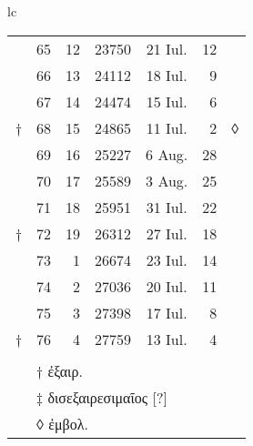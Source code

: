 \begin{tabular}{lc}
\begin{tabular}[t]{r rrccr l}
\cline{2-6}
~ & 65 & 12 & 23750 & 21 Iul. & 12 \\
~ & 66 & 13 & 24112 & 18 Iul. &  9 \\
~ & 67 & 14 & 24474 & 15 Iul. &  6 \\
† & 68 & 15 & 24865 & 11 Iul. &  2 & ◊ \\
\cline{2-6}
~ & 69 & 16 & 25227 &  6 Aug. & 28 \\
~ & 70 & 17 & 25589 &  3 Aug. & 25 \\
~ & 71 & 18 & 25951 & 31 Iul. & 22 \\
† & 72 & 19 & 26312 & 27 Iul. & 18 \\
\cline{2-6}
~ & 73 &  1 & 26674 & 23 Iul. & 14 \\
~ & 74 &  2 & 27036 & 20 Iul. & 11 \\
~ & 75 &  3 & 27398 & 17 Iul. &  8 \\
† & 76 &  4 & 27759 & 13 Iul. &  4 \\
\cline{2-6}
\\
~ & \multicolumn{5}{l}{† \textgreek{ἐξαιρ.}}\\
~ & \multicolumn{5}{l}{‡ \textgreek{δισεξαιρεσιμαῖος [?]}}\\
~ & \multicolumn{5}{l}{◊ \textgreek{ἐμβολ.}}\\
\end{tabular}
\end{tabular}
%
